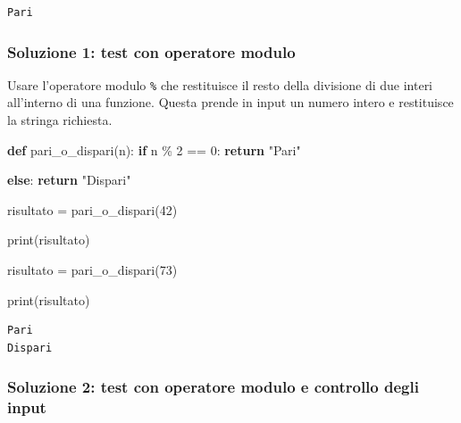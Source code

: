\documentclass[
  letterpaper,
]{scrbook}
\newenvironment{Shaded}{\begin{snugshade}}{\end{snugshade}}
\newcommand{\BuiltInTok}[1]{\textcolor[rgb]{0.00,0.23,0.31}{#1}}
\newcommand{\ControlFlowTok}[1]{\textcolor[rgb]{0.00,0.23,0.31}{\textbf{#1}}}
\newcommand{\DecValTok}[1]{\textcolor[rgb]{0.68,0.00,0.00}{#1}}
\newcommand{\KeywordTok}[1]{\textcolor[rgb]{0.00,0.23,0.31}{\textbf{#1}}}
\newcommand{\NormalTok}[1]{\textcolor[rgb]{0.00,0.23,0.31}{#1}}
\newcommand{\OperatorTok}[1]{\textcolor[rgb]{0.37,0.37,0.37}{#1}}
\newcommand{\StringTok}[1]{\textcolor[rgb]{0.13,0.47,0.30}{#1}}
\begin{document}
\begin{verbatim}
Pari
\end{verbatim}

\subsubsection{Soluzione 1: test con operatore
modulo}\label{soluzione-1-test-con-operatore-modulo}

\begin{tcolorbox}[enhanced jigsaw, leftrule=.75mm, arc=.35mm, opacityback=0, rightrule=.15mm, titlerule=0mm, colbacktitle=quarto-callout-tip-color!10!white, colback=white, colframe=quarto-callout-tip-color-frame, bottomrule=.15mm, toprule=.15mm, bottomtitle=1mm, toptitle=1mm, title=\textcolor{quarto-callout-tip-color}{\faLightbulb}\hspace{0.5em}{Suggerimento}, breakable, coltitle=black, opacitybacktitle=0.6, left=2mm]

Usare l'operatore modulo \texttt{\%} che restituisce il resto della
divisione di due interi all'interno di una funzione. Questa prende in
input un numero intero e restituisce la stringa richiesta.

\end{tcolorbox}

\begin{Shaded}
\begin{Highlighting}[]
\KeywordTok{def}\NormalTok{ pari\_o\_dispari(n):}
  \ControlFlowTok{if}\NormalTok{ n }\OperatorTok{\%} \DecValTok{2} \OperatorTok{==} \DecValTok{0}\NormalTok{:}
    \ControlFlowTok{return} \StringTok{"Pari"}

  \ControlFlowTok{else}\NormalTok{:}
    \ControlFlowTok{return} \StringTok{"Dispari"}

\NormalTok{risultato }\OperatorTok{=}\NormalTok{ pari\_o\_dispari(}\DecValTok{42}\NormalTok{)}

\BuiltInTok{print}\NormalTok{(risultato)}

\NormalTok{risultato }\OperatorTok{=}\NormalTok{ pari\_o\_dispari(}\DecValTok{73}\NormalTok{)}

\BuiltInTok{print}\NormalTok{(risultato)}
\end{Highlighting}
\end{Shaded}

\begin{verbatim}
Pari
Dispari
\end{verbatim}

\subsubsection{Soluzione 2: test con operatore modulo e controllo degli
input}\label{soluzione-2-test-con-operatore-modulo-e-controllo-degli-input}
\end{document}
